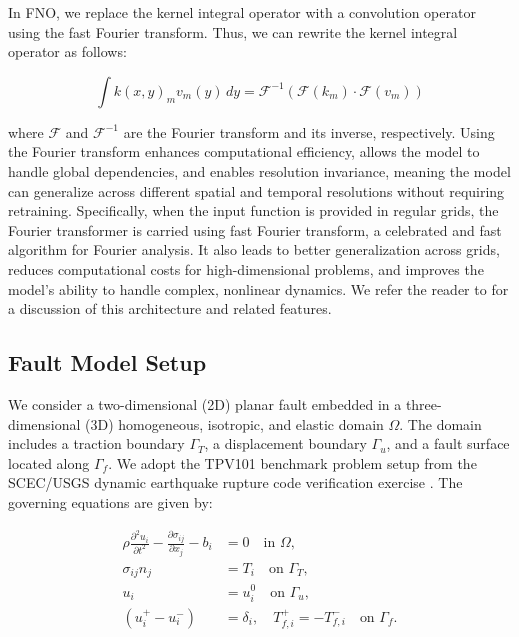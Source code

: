\documentclass[draft]{agujournal2019}
\begin{document}
In FNO, we replace the kernel integral operator with a convolution operator using the fast Fourier transform. Thus, we can rewrite the kernel integral operator as follows:

\begin{equation}
\label{eqn:kernel}
    \int k(x,y)_{m} v_{m}(y)\,dy  = \mathcal{F}^{-1}(\mathcal{F}(k_m) \cdot \mathcal{F}(v_m))
\end{equation}

where $\mathcal{F}$ and $\mathcal{F}^{-1}$ are the Fourier transform and its inverse, respectively. Using the Fourier transform enhances computational efficiency, allows the model to handle global dependencies, and enables resolution invariance, meaning the model can generalize across different spatial and temporal resolutions without requiring retraining. Specifically, when the input function is provided in regular grids, the Fourier transformer is carried using fast Fourier transform, a celebrated and fast algorithm for Fourier analysis. It also leads to better generalization across grids, reduces computational costs for high-dimensional problems, and improves the model's ability to handle complex, nonlinear dynamics. We refer the reader to \cite{li2020fourier} for a discussion of this architecture and related features.

\subsection{Fault Model Setup}
\label{sec:fault_model}

We consider a two-dimensional (2D) planar fault embedded in a three-dimensional (3D) homogeneous, isotropic, and elastic domain \( \Omega \). The domain includes a traction boundary \( \Gamma_T \), a displacement boundary \( \Gamma_u \), and a fault surface located along \( \Gamma_f \). We adopt the TPV101 benchmark problem setup from the SCEC/USGS dynamic earthquake rupture code verification exercise \cite{harris2018suite, harris2009scec, kammer2021uguca}. The governing equations are given by:

\begin{align}
\rho \frac{\partial^2 u_i}{\partial t^2} - \frac{\partial \sigma_{ij}}{\partial x_j} - b_i &= 0 \quad \text{in } \Omega, \\
\sigma_{ij} n_j &= T_i \quad \text{on } \Gamma_T, \\
u_i &= u_i^0 \quad \text{on } \Gamma_u, \\
(u_i^+ - u_i^-) &= \delta_i, \quad T_{f,i}^+ = -T_{f,i}^- \quad \text{on } \Gamma_f.
\end{align}
\end{document}
